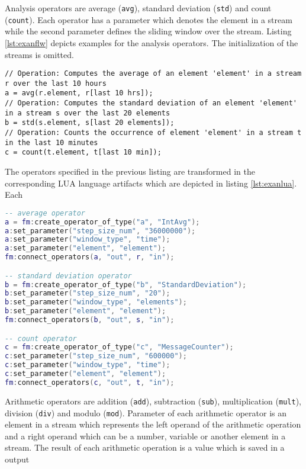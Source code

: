 Analysis operators are average (\texttt{avg}), standard deviation (\texttt{std})
and count (\texttt{count}). Each operator has a parameter which denotes the 
element in a stream while the second parameter defines the sliding window over
the stream. Listing \ref{lst:exanflw} depicts examples for the analysis 
operators. The initialization of the streams is omitted. 
\begin{lstlisting}[language=Flow, caption={\emph{Examples of Analysis Operators in Flow}},label={lst:exanflw}]
// Operation: Computes the average of an element 'element' in a stream r over the last 10 hours
a = avg(r.element, r[last 10 hrs]);
// Operation: Computes the standard deviation of an element 'element' in a stream s over the last 20 elements
b = std(s.element, s[last 20 elements]);
// Operation: Counts the occurrence of element 'element' in a stream t in the last 10 minutes
c = count(t.element, t[last 10 min]);
\end{lstlisting}
The operators specified in the previous listing are transformed in the 
corresponding LUA language artifacts which are depicted in listing 
\ref{lst:exanlua}. Each 
\begin{lstlisting}[language=Lua, caption={\emph{Examples of Analysis Operators in LUA}},label={lst:exanlua}]
-- average operator
a = fm:create_operator_of_type("a", "IntAvg");
a:set_parameter("step_size_num", "36000000");
a:set_parameter("window_type", "time");
a:set_parameter("element", "element");
fm:connect_operators(a, "out", r, "in");

-- standard deviation operator
b = fm:create_operator_of_type("b", "StandardDeviation");
b:set_parameter("step_size_num", "20");
b:set_parameter("window_type", "elements");
b:set_parameter("element", "element");
fm:connect_operators(b, "out", s, "in");

-- count operator
c = fm:create_operator_of_type("c", "MessageCounter");
c:set_parameter("step_size_num", "600000");
c:set_parameter("window_type", "time");
c:set_parameter("element", "element");
fm:connect_operators(c, "out", t, "in");
\end{lstlisting}
Arithmetic operators are addition (\texttt{add}), subtraction 
(\texttt{sub}), multiplication (\texttt{mult}), division (\texttt{div}) and
modulo (\texttt{mod}). Parameter of each arithmetic operator is an element in
a stream which represents the left operand of the arithmetic operation and
a right operand which can be a number, variable or another element in a stream. 
The result of each arithmetic operation is a value which is saved in a output
